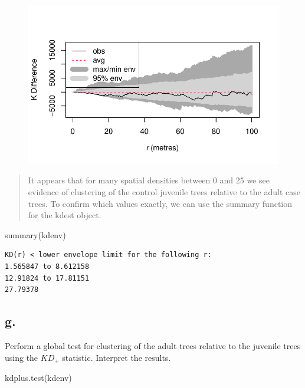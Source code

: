 \documentclass[
  letterpaper,
  DIV=11,
  numbers=noendperiod]{scrartcl}
\newenvironment{Shaded}{\begin{snugshade}}{\end{snugshade}}
\newcommand{\FunctionTok}[1]{\textcolor[rgb]{0.28,0.35,0.67}{#1}}
\newcommand{\NormalTok}[1]{\textcolor[rgb]{0.00,0.23,0.31}{#1}}
\begin{document}
\begin{figure}[H]

{\centering \includegraphics{cc-r-kd-hw_files/figure-pdf/unnamed-chunk-14-2.pdf}

}

\end{figure}

\begin{quote}
It appears that for many spatial densities between 0 and 25 we see
evidence of clustering of the control juvenile trees relative to the
adult case trees. To confirm which values exactly, we can use the
summary function for the kdest object.
\end{quote}

\begin{Shaded}
\begin{Highlighting}[]
\FunctionTok{summary}\NormalTok{(kdenv)}
\end{Highlighting}
\end{Shaded}

\begin{verbatim}
KD(r) < lower envelope limit for the following r:
1.565847 to 8.612158 
12.91824 to 17.81151 
27.79378 
\end{verbatim}

\hypertarget{g.-1}{%
\subsection{g.}\label{g.-1}}

Perform a global test for clustering of the adult trees relative to the
juvenile trees using the \(KD_+\) statistic. Interpret the results.

\begin{Shaded}
\begin{Highlighting}[]
\FunctionTok{kdplus.test}\NormalTok{(kdenv)}
\end{Highlighting}
\end{Shaded}
\end{document}
